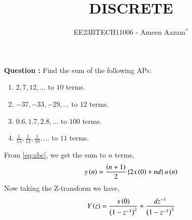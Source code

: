 \documentclass[journal,12pt,twocolumn]{IEEEtran}
\theoremstyle{remark}
\begin{document}

\vspace{3cm}

\title{DISCRETE}
\author{EE23BTECH11006 - Ameen Aazam$^{*}$%
}
\maketitle
\newpage
\bigskip

\renewcommand{\thefigure}{\theenumi}
\renewcommand{\thetable}{\theenumi}

\vspace{3cm}
\textbf{Question :}
Find the sum of the following APs:
\begin{enumerate}[label=(\alph*)]
\item $2, 7, 12, \ldots$ to $10$ terms.
\item $-37, -33, -29, \ldots$ to $12$ terms.
\item $0.6, 1.7, 2.8, \ldots$ to $100$ terms.
\item $\frac{1}{15}, \frac{1}{12}, \frac{1}{10}, \ldots$ to $11$ terms.
\end{enumerate}
\solution

From \eqref{eq:abc}, we get the sum to $n$ terms,
\begin{align}
    y\left(n\right)=\frac{\left(n+1\right)}{2}\left\{2x\left(0\right)+nd\right\}u\left(n\right)
\end{align}
Now taking the Z-transform we have,
\begin{align}
    Y\left(z\right)=\frac{x\left(0\right)}{\left(1-z^{-1}\right)^2}+\frac{dz^{-1}}{\left(1-z^{-1}\right)^3}
\end{align}
\end{document}
